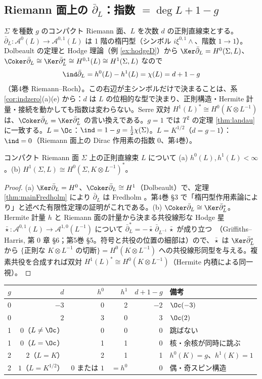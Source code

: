 \subsection{Riemann 面上の $\bar\partial_L$：指数 $=\deg L+1-g$}
$\Sigma$ を種数 $g$ のコンパクト Riemann 面、$L$ を次数 $d$ の正則直線束とする。$\bar\partial_L:\mathcal A^0(L)\to\mathcal A^{0,1}(L)$ は 1 階の楕円型（シンボル $i\xi^{0,1}\wedge$、階数 $1\to1$）。Dolbeault の定理と Hodge 理論（例 \ref{ex:hodgeD}）から $\Ker\bar\partial_L=H^0(\Sigma,L)$、$\Coker\bar\partial_L\cong\Ker\bar\partial_L^*\cong H^{0,1}(L)\cong H^1(\Sigma,L)$ なので
\[
\ind\bar\partial_L=h^0(L)-h^1(L)=\chi(L)=d+1-g
\]
（第4巻 Riemann--Roch）。この右辺が主シンボルだけで決まることは、系 \ref{cor:indzero}(a)(e) から：$d$ は $L$ の位相的な型で決まり、正則構造・Hermite 計量・接続を動かしても指数は変わらない。Serre 双対 $H^1(L)^*\cong H^0(K\otimes L^{-1})$ は、$\Coker\bar\partial_L=\Ker\bar\partial_L^*$ の言い換えである。$g=1$ では $T^2$ の定理 \ref{thm:landau} に一致する。$L=\Oc$：$\ind=1-g=\frac12\chi(\Sigma)$。$L=K^{1/2}$（$d=g-1$）：$\ind=0$（Riemann 面上の Dirac 作用素の指数 $0$、第4巻）。
\begin{thm}\label{thm:serre1}
コンパクト Riemann 面 $\Sigma$ 上の正則直線束 $L$ について (a) $h^0(L),h^1(L)<\infty$。(b) $H^1(\Sigma,L)\cong H^0(\Sigma,K\otimes L^{-1})^*$。
\end{thm}
\begin{proof}
(a) $\Ker\bar\partial_L=H^0$、$\Coker\bar\partial_L\cong H^1$（Dolbeault）で、定理 \ref{thm:mainFredholm} により $\bar\partial_L$ は Fredholm \tP。第4巻 \S3 で「楕円型作用素論により」と述べた有限性定理の証明がこれである。(b) $\Coker\bar\partial_L\cong\Ker\bar\partial_L^*$。Hermite 計量 $h$ と Riemann 面の計量から決まる共役線形な Hodge 星 $\bar\star:\mathcal A^{0,1}(L)\to\mathcal A^{1,0}(L^{-1})$ について $\bar\partial_L^*=-\bar\star\,\bar\partial_{L^{-1}}\,\bar\star$ が成り立つ\tC\ （Griffiths--Harris, 第 0 章 \S6；第5巻 \S5。符号と共役の位置の細部は\tQ）ので、$\bar\star$ は $\Ker\bar\partial_L^*$ から $\{\text{正則な }K\otimes L^{-1}\text{ の切断}\}=H^0(K\otimes L^{-1})$ への共役線形同型を与える。複素共役を合成すれば双対 $H^1(L)^*\cong H^0(K\otimes L^{-1})$（Hermite 内積による同一視）。
\end{proof}
\begin{center}
\renewcommand{\arraystretch}{1.15}
\begin{tabular}{rrrrrl}
\toprule
$g$ & $d$ & $h^0$ & $h^1$ & $d+1-g$ & 備考\\
\midrule
0 & $-3$ & 0 & 2 & $-2$ & $\Oc(-3)$\\
0 & $2$ & 3 & 0 & $3$ & $\Oc(2)$\\
1 & $0$（$L\ne\Oc$） & 0 & 0 & 0 & 跳ばない\\
1 & $0$（$L=\Oc$） & 1 & 1 & 0 & 核・余核が同時に跳ぶ\\
2 & $2$（$L=K$） & 2 & 1 & 1 & $h^0(K)=g$、$h^1(K)=1$\\
2 & $1$（$L=K^{1/2}$） & $0$ または $1$ & $=h^0$ & 0 & 偶・奇スピン構造\\
\bottomrule
\end{tabular}
\end{center}

